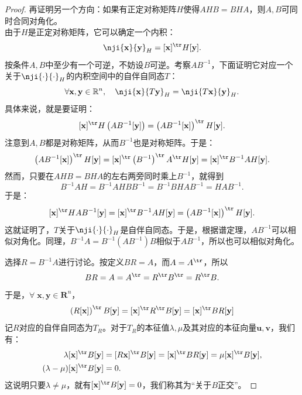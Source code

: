 \documentclass[12pt,UTF8,fontset=none]{ctexbook}
\begin{document}
\begin{appendix}
\begin{proof}
    再证明另一个方向：如果有正定对称矩阵$H$使得$AHB=BHA$，则$A,B$可同时合同对角化。\\
    由于$H$是正定对称矩阵，它可以确定一个内积：
    $$\nji{\mathbf{x}}{\mathbf{y}}_H = [\mathbf{x}]^{\tr}H[\mathbf{y}].$$
    按条件$A,B$中至少有一个可逆，不妨设$B$可逆。考察$AB^{-1}$，下面证明它对应一个关于$\nji{\cdot}{\cdot}_H$的内积空间中的自伴自同态$T$：
    $$ \forall \mathbf{x}, \mathbf{y} \in \mathbb{R}^n,\quad \nji{\mathbf{x}}{T\mathbf{y}}_H = \nji{T\mathbf{x}}{\mathbf{y}}_H. $$
    具体来说，就是要证明：
    $$ [\mathbf{x}]^{\tr}H\left(AB^{-1}[\mathbf{y}]\right) = \left(AB^{-1}[\mathbf{x}]\right)^{\tr}H[\mathbf{y}]. $$
    注意到$A,B$都是对称矩阵，从而$B^{-1}$也是对称矩阵。于是：
    \begin{align*}
        \left(AB^{-1}[\mathbf{x}]\right)^{\tr}H[\mathbf{y}] = [\mathbf{x}]^{\tr}\left(B^{-1}\right)^{\tr}A^{\tr}H[\mathbf{y}] = [\mathbf{x}]^{\tr}B^{-1}AH[\mathbf{y}].
    \end{align*}
    然而，只要在$AHB=BHA$的左右两旁同时乘上$B^{-1}$，就得到
    $$ B^{-1}AH = B^{-1}AHBB^{-1} = B^{-1}BHAB^{-1} =  HAB^{-1} .$$
    于是：
    $$ [\mathbf{x}]^{\tr}HAB^{-1}[\mathbf{y}] = [\mathbf{x}]^{\tr}B^{-1}AH[\mathbf{y}] = \left(AB^{-1}[\mathbf{x}]\right)^{\tr}H[\mathbf{y}]. $$
    这就证明了，$T$关于$\nji{\cdot}{\cdot}_H$是自伴自同态。于是，根据谱定理，$AB^{-1}$可以相似对角化。同理，$B^{-1}A = B^{-1}(AB^{-1})B$相似于$AB^{-1}$，所以也可以相似对角化。
    
    选择$R = B^{-1}A$进行讨论。按定义$B R = A$，而$A = A^{\tr}$，所以
    $$
    BR = A = A^{\tr} = R^{\tr} B^{\tr} = R^{\tr} B.
    $$
    于是，$\forall \; \mathbf{x}, \mathbf{y} \in \mathbf{R}^n$，
    $$
    \left(R[\mathbf{x}]\right)^{\tr}B[\mathbf{y}] =  [\mathbf{x}]^{\tr}R^{\tr}B[\mathbf{y}] = [\mathbf{x}]^{\tr}BR[\mathbf{y}] 
    $$
    记$R$对应的自伴自同态为$T_R$。对于$T_R$的本征值$\lambda, \mu$及其对应的本征向量$\mathbf{u}, \mathbf{v}$，我们有：
    \begin{align*}
        \lambda [\mathbf{x}]^{\tr}B[\mathbf{y}] & = [R\mathbf{x}]^{\tr}B[\mathbf{y}] = [\mathbf{x}]^{\tr}BR[\mathbf{y}] = \mu[\mathbf{x}]^{\tr}B[\mathbf{y}], \\
        (\lambda - \mu) [\mathbf{x}]^{\tr}B[\mathbf{y}] &= 0.
    \end{align*}
    这说明只要$\lambda \neq \mu$，就有$[\mathbf{x}]^{\tr}B[\mathbf{y}] = 0$，我们称其为“关于$B$正交”。


\end{proof}
\end{appendix}
\end{document}
